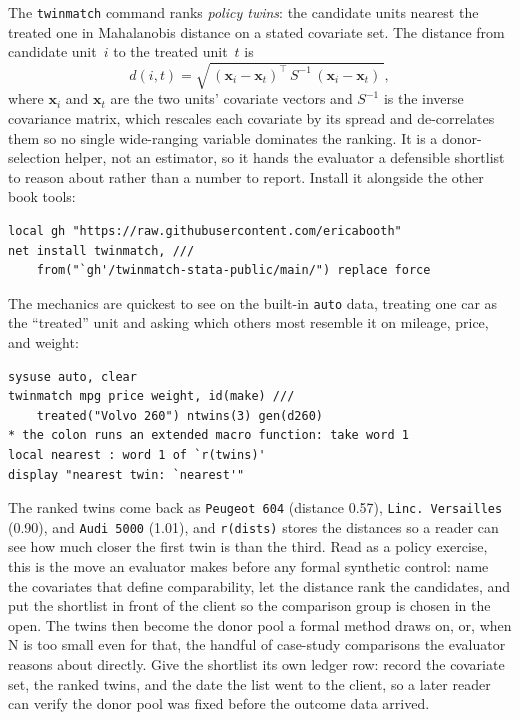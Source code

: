 \documentclass[
    a4paper,
    fontsize=10pt,
    twoside=true,
    numbers=noenddot,
]{kaobook}
\begin{document}
The \texttt{twinmatch} command ranks \emph{policy twins}: the candidate units nearest the treated one in Mahalanobis distance on a stated covariate set. The distance from candidate unit~$i$ to the treated unit~$t$ is
\[
d(i,t)=\sqrt{\,(\mathbf{x}_i-\mathbf{x}_t)^{\!\top}\,S^{-1}\,(\mathbf{x}_i-\mathbf{x}_t)\,},
\]
where $\mathbf{x}_i$ and $\mathbf{x}_t$ are the two units' covariate vectors and $S^{-1}$ is the inverse covariance matrix, which rescales each covariate by its spread and de-correlates them so no single wide-ranging variable dominates the ranking. It is a donor-selection helper, not an estimator, so it hands the evaluator a defensible shortlist to reason about rather than a number to report. Install it alongside the other book tools:
\par
{\footnotesize
\begin{verbatim}
local gh "https://raw.githubusercontent.com/ericabooth"
net install twinmatch, ///
    from("`gh'/twinmatch-stata-public/main/") replace force
\end{verbatim}
}
The mechanics are quickest to see on the built-in \texttt{auto} data, treating one car as the \enquote{treated} unit and asking which others most resemble it on mileage, price, and weight:
\par
{\footnotesize
\begin{verbatim}
sysuse auto, clear
twinmatch mpg price weight, id(make) ///
    treated("Volvo 260") ntwins(3) gen(d260)
* the colon runs an extended macro function: take word 1
local nearest : word 1 of `r(twins)'
display "nearest twin: `nearest'"
\end{verbatim}
}
The ranked twins come back as \texttt{Peugeot 604} (distance 0.57), \texttt{Linc.\ Versailles} (0.90), and \texttt{Audi 5000} (1.01), and \texttt{r(dists)} stores the distances so a reader can see how much closer the first twin is than the third. Read as a policy exercise, this is the move an evaluator makes before any formal synthetic control: name the covariates that define comparability, let the distance rank the candidates, and put the shortlist in front of the client so the comparison group is chosen in the open. The twins then become the donor pool a formal method draws on, or, when N is too small even for that, the handful of case-study comparisons the evaluator reasons about directly. Give the shortlist its own ledger row: record the covariate set, the ranked twins, and the date the list went to the client, so a later reader can verify the donor pool was fixed before the outcome data arrived.
\end{document}

